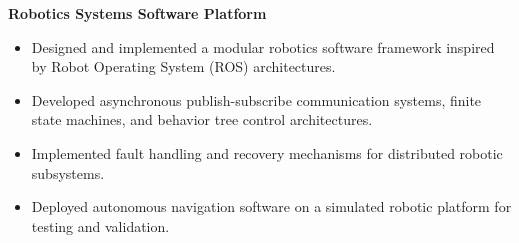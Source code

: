 \textbf{Robotics Systems Software Platform}
\begin{itemize}
  \item Designed and implemented a modular robotics software framework inspired by Robot Operating System (ROS) architectures.
  \item Developed asynchronous publish-subscribe communication systems, finite state machines, and behavior tree control architectures.
  \item Implemented fault handling and recovery mechanisms for distributed robotic subsystems.
  \item Deployed autonomous navigation software on a simulated robotic platform for testing and validation.
\end{itemize}
